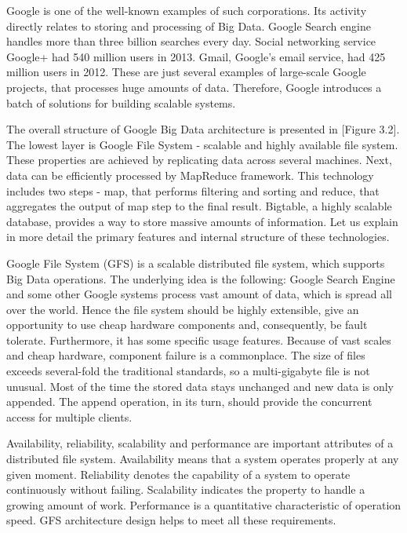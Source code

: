 Google is one of the well-known examples of such corporations.
Its activity directly relates to storing and processing of Big Data.
Google Search engine handles more than three billion searches every day.
Social networking service Google+ had 540 million users in 2013.
Gmail, Google's email service, had 425 million users in 2012.
These are just several examples of large-scale Google projects, that processes huge amounts of data.
Therefore, Google introduces a batch of solutions for building scalable systems. 

The overall structure of Google Big Data architecture is presented in [Figure 3.2].
The lowest layer is Google File System - scalable and highly available file system. 
These properties are achieved by replicating data across several machines.
Next, data can be efficiently processed by MapReduce framework.
This technology includes two steps - map, that performs filtering and sorting and reduce, that aggregates the output of map step to the final result.
Bigtable, a highly scalable database, provides a way to store massive amounts of information.
Let us explain in more detail the primary features and internal structure of these technologies.

Google File System (GFS) is a scalable distributed file system, which supports Big Data operations.
The underlying idea is the following: Google Search Engine and some other Google systems process vast amount of data, which is spread all over the world.
Hence the file system should be highly extensible, give an opportunity to use cheap hardware components and, consequently, be fault tolerate. 
Furthermore, it has some specific usage features.
Because of vast scales and cheap hardware, component failure is a commonplace.
The size of files exceeds several-fold the traditional standards, so a multi-gigabyte file is not unusual.
Most of the time the stored data stays unchanged and new data is only appended.
The append operation, in its turn, should provide the concurrent access for multiple clients.

Availability, reliability, scalability and performance are important attributes of a distributed file system.
Availability means that a system operates properly at any given moment.
Reliability denotes the capability of a system to operate continuously without failing.
Scalability indicates the property to handle a growing amount of work.
Performance is a quantitative characteristic of operation speed.  
GFS architecture design helps to meet all these requirements.

